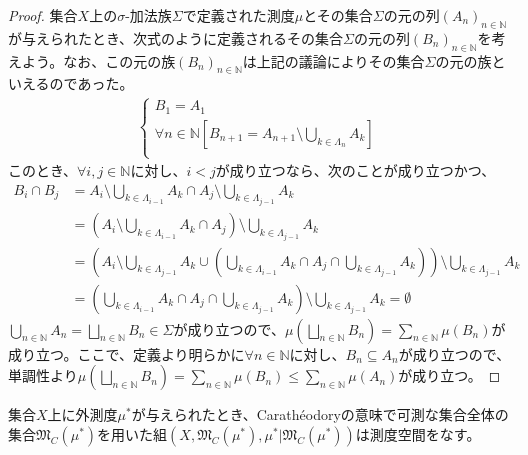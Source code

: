 \documentclass[dvipdfmx]{jsarticle}
\begin{document}
\begin{proof}
集合$X$上の$\sigma$-加法族$\varSigma$で定義された測度$\mu$とその集合$\varSigma$の元の列$\left( A_{n} \right)_{n \in \mathbb{N}}$が与えられたとき、次式のように定義されるその集合$\varSigma$の元の列$\left( B_{n} \right)_{n \in \mathbb{N}}$を考えよう。なお、この元の族$\left( B_{n} \right)_{n \in \mathbb{N}}$は上記の議論によりその集合$\varSigma$の元の族といえるのであった。
\begin{align*}
\left\{ \begin{matrix}
B_{1} = A_{1} \\
\forall n \in \mathbb{N}\left[ B_{n + 1} = A_{n + 1} \setminus \bigcup_{k \in \varLambda_{n}} A_{k} \right] \\
\end{matrix} \right.\ 
\end{align*}
このとき、$\forall i,j \in \mathbb{N}$に対し、$i < j$が成り立つなら、次のことが成り立つかつ、
\begin{align*}
B_{i} \cap B_{j} &= A_{i} \setminus \bigcup_{k \in \varLambda_{i - 1}} A_{k} \cap A_{j} \setminus \bigcup_{k \in \varLambda_{j - 1}} A_{k}\\
&= \left( A_{i} \setminus \bigcup_{k \in \varLambda_{i - 1}} A_{k} \cap A_{j} \right) \setminus \bigcup_{k \in \varLambda_{j - 1}} A_{k}\\
&= \left( A_{i} \setminus \bigcup_{k \in \varLambda_{j - 1}} A_{k} \cup \left( \bigcup_{k \in \varLambda_{i - 1}} A_{k} \cap A_{j} \cap \bigcup_{k \in \varLambda_{j - 1}} A_{k} \right) \right) \setminus \bigcup_{k \in \varLambda_{j - 1}} A_{k}\\
&= \left( \bigcup_{k \in \varLambda_{i - 1}} A_{k} \cap A_{j} \cap \bigcup_{k \in \varLambda_{j - 1}} A_{k} \right) \setminus \bigcup_{k \in \varLambda_{j - 1}} A_{k} = \emptyset
\end{align*}
$\bigcup_{n \in \mathbb{N}} A_{n} = \bigsqcup_{n \in \mathbb{N}} B_{n} \in \varSigma$が成り立つので、$\mu\left( \bigsqcup_{n \in \mathbb{N}} B_{n} \right) = \sum_{n \in \mathbb{N}} {\mu\left( B_{n} \right)}$が成り立つ。ここで、定義より明らかに$\forall n \in \mathbb{N}$に対し、$B_{n} \subseteq A_{n}$が成り立つので、単調性より$\mu\left( \bigsqcup_{n \in \mathbb{N}} B_{n} \right) = \sum_{n \in \mathbb{N}} {\mu\left( B_{n} \right)} \leq \sum_{n \in \mathbb{N}} {\mu\left( A_{n} \right)}$が成り立つ。
\end{proof}
\begin{thm}\label{4.5.3.13}
集合$X$上に外測度$\mu^{*}$が与えられたとき、Carathéodoryの意味で可測な集合全体の集合$\mathfrak{M}_{C}\left( \mu^{*} \right)$を用いた組$\left( X,\mathfrak{M}_{C}\left( \mu^{*} \right),\mu^{*}|\mathfrak{M}_{C}\left( \mu^{*} \right) \right)$は測度空間をなす。
\end{thm}
\end{document}
